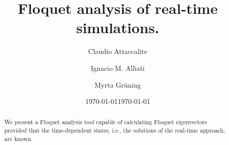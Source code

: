 \documentclass[aps,physrev,preprint,groupedaddress]{revtex4-2}
\date{\today}
\renewcommand{\[}{\left[}
\renewcommand{\]}{\right]}
\renewcommand{\(}{\left(}
\renewcommand{\)}{\right)}
\begin{document}

\title{Floquet analysis of real-time simulations.}


\author{Claudio Attaccalite}
\author{Ignacio M. Alliati}
\affiliation{}
\author{Myrta Gr\"uning}
\affiliation{}



\date{\today}

\begin{abstract}
We present a Floquet analysis tool capable of calculating Floquet eigenvectors provided that the time-dependent states, i.e., the solutions of the real-time approach, are known. 
\end{abstract}


\maketitle
\end{document}
